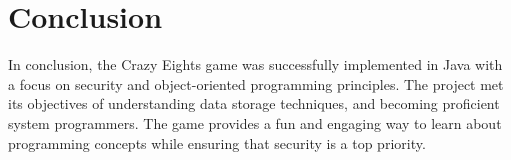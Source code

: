 \documentclass[conference]{IEEEtran}
\begin{document}
\section{Conclusion}
In conclusion, the Crazy Eights game was successfully implemented in Java with a focus on security and object-oriented programming principles. The project met its objectives of understanding data storage techniques, and becoming proficient system programmers. The game provides a fun and engaging way to learn about programming concepts while ensuring that security is a top priority.
\end{document}

